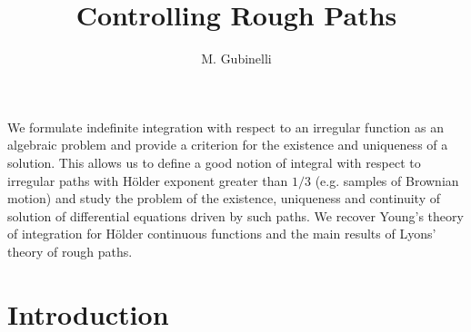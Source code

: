 \documentclass[a4paper,12pt,reqno]{amsproc}
\begin{document}
\title{Controlling Rough Paths}
\author{M. Gubinelli}
\address{Dipartimento di  Matematica Applicata ``U.Dini''
Via Bonanno Pisano, 25 bis - 56125 Pisa, ITALIA}

\abstract
 We formulate indefinite integration with respect to an irregular
 function as an algebraic problem and provide a criterion for the
 existence and uniqueness of a solution. This allows us to define a
 good notion of integral with respect to  irregular paths with
 H\"older exponent greater than $1/3$ (e.g.
 samples of Brownian motion) and study the problem of the existence,
 uniqueness and continuity of solution of
 differential equations driven by such paths.
 We recover 
 Young's theory of integration for H\"older continuous functions and
 the main results of Lyons' theory of rough paths.  
\endabstract
\maketitle
\section{Introduction}
\end{document}
